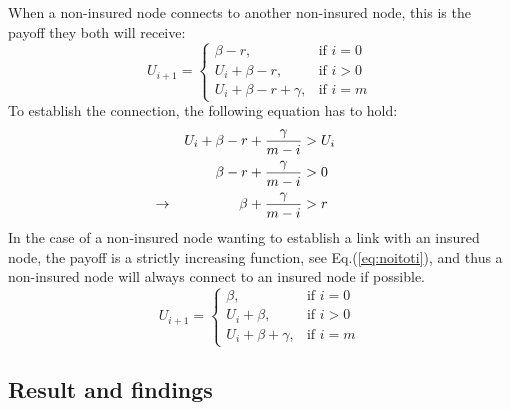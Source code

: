 When a non-insured node connects to another non-insured node, this is the payoff they both will receive:
\begin{equation}
    U_{i+1}= 
\begin{cases}
     \beta -r,& \text{if } i = 0\\
    U_{i}+\beta -r,& \text{if }  i>0\\
    U_{i}+\beta -r +\gamma,& \text{if } i=m
\end{cases}
\label{eq:noitonoti}
\end{equation}
To establish the connection, the following equation has to hold:
\begin{eqnarray}
U_{i}+\beta-r+\frac{\gamma}{m-i}&>U_{i} \nonumber \\ 
\beta-r+\frac{\gamma}{m-i}&>0 \nonumber \\ 
\llap{$\rightarrow$\hspace{50pt}} \beta+\frac{\gamma}{m-i}&>r
\end{eqnarray}
In the case of a non-insured node wanting to establish a link with an insured node, the payoff is a strictly increasing function, see Eq.(\ref{eq:noitoti}), and thus a non-insured node will always connect to an insured node if possible.
\begin{equation}
    U_{i+1}= 
\begin{cases}
    \beta,& \text{if } i = 0\\
    U_{i}+\beta,& \text{if }  i>0\\
    U_{i}+\beta +\gamma,& \text{if } i=m
\end{cases}
\label{eq:noitoti}
\end{equation}

\subsection{Result and findings}

